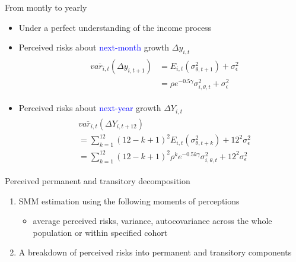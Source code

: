 \documentclass{beamer}
\begin{document}
\begin{frame}{From montly to yearly}
	\begin{itemize}
		\item Under a perfect understanding of the income process
	\end{itemize}
	\begin{itemize}
		\item Perceived risks about \textcolor{blue}{next-month} growth $\Delta y_{i,t}$
		\begin{eqnarray*}
			\begin{split}
				& \overline {var_{i,t}}(\Delta y_{i,t+1}) & = E_{i,t}( {\sigma^2_{\theta,t+1}}) + \sigma^2_{\epsilon} \\
				& & = \rho e^{-0.5\gamma} \sigma^2_{i,\theta,t}  + \sigma^2_{\epsilon} 
			\end{split}
		\end{eqnarray*}
		
		\item Perceived risks about \textcolor{blue}{next-year} growth $\Delta Y_{i,t}$
		\begin{eqnarray*}
		\begin{split}
			& \overline {var_{i,t}}(\Delta Y_{i,t+12}) \\
			& = \sum^{12}_{k=1} (12-k+1)^2 E_{i,t}( {\sigma^2_{\theta,t+k}}) + 12^2 \sigma^2_{\epsilon} \\ 
			& = \sum^{12}_{k=1} (12-k+1)^2 \rho^k e^{-0.5k\gamma} \sigma^2_{i,\theta,t}+ 12^2 \sigma^2_{\epsilon}  	 
		\end{split}
	\end{eqnarray*}
	\end{itemize}
\end{frame}

\begin{frame}{Perceived permanent and transitory decomposition}
	\begin{enumerate}
	\item SMM estimation using the following moments of perceptions 
	\begin{itemize}
     \item average perceived risks, variance, autocovariance across the whole population or within specified cohort
	\end{itemize}
\item A breakdown of perceived risks into permanent and transitory components %
\end{enumerate}
\end{frame}
\end{document}
